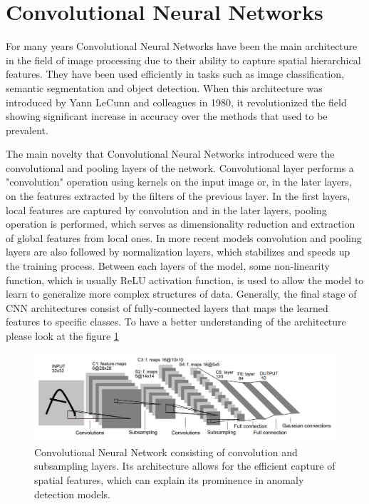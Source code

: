 \section{Convolutional Neural Networks}
\label{cnn}
For many years Convolutional Neural Networks have been the main architecture in the field of image processing due to their ability to capture spatial hierarchical features. They have been used efficiently in tasks such as image classification, semantic segmentation and object detection. When this architecture was introduced by Yann LeCunn and colleagues in 1980, it revolutionized the field showing significant increase in accuracy over the methods that used to be prevalent.

The main novelty that Convolutional Neural Networks introduced were the convolutional and pooling layers of the network. Convolutional layer performs a "convolution" operation using kernels on the input image or, in the later layers, on the features extracted by the filters of the previous layer. In the first layers, local features are captured by convolution and in the later layers, pooling operation is performed, which serves as dimensionality reduction and extraction of global features from local ones. In more recent models convolution and pooling layers are also followed by normalization layers, which stabilizes and speeds up the training process. Between each layers of the model, some non-linearity function, which is usually ReLU activation function, is used to allow the model to learn to generalize more complex structures of data. Generally, the final stage of CNN architectures consist of fully-connected layers that maps the learned features to specific classes. To have a better understanding of the architecture please look at the figure \ref{fig:cnn}

\begin{figure}[h]
	\begin{center}
		\includegraphics[width=1.0\linewidth]{Chapter_2/cnn.png}
	\end{center}
	\caption{Convolutional Neural Network consisting of convolution and subsampling layers. Its architecture allows for the efficient capture of spatial features, which can explain its prominence in anomaly detection models.}
	\label{fig:cnn}
\end{figure}

